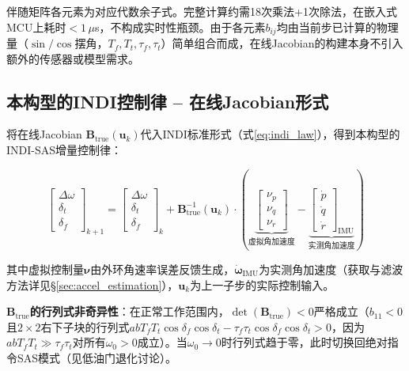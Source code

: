 伴随矩阵各元素为对应代数余子式。完整计算约需18次乘法+1次除法，在嵌入式MCU上耗时$<1\,\mu$s，不构成实时性瓶颈。由于各元素$b_{ij}$均由当前步已计算的物理量（$\sin/\cos$摆角，$T_f,T_t,\tau_f,\tau_t$）简单组合而成，在线Jacobian的构建本身不引入额外的传感器或模型需求。

\subsection{本构型的INDI控制律 -- 在线Jacobian形式}

将在线Jacobian $\mathbf{B}_{\mathrm{true}}(\mathbf{u}_k)$代入INDI标准形式（式\ref{eq:indi_law}），得到本构型的INDI-SAS增量控制律：

\begin{equation}
    \boxed{
    \begin{bmatrix} \Delta\omega \\ \delta_t \\ \delta_f \end{bmatrix}_{k+1}
    =
    \begin{bmatrix} \Delta\omega \\ \delta_t \\ \delta_f \end{bmatrix}_{k}
    +
    \mathbf{B}_{\mathrm{true}}^{-1}(\mathbf{u}_k)
    \cdot
    \left(
    \underbrace{\begin{bmatrix} \nu_p \\ \nu_q \\ \nu_r \end{bmatrix}}_{\text{虚拟角加速度}}
    -
    \underbrace{\begin{bmatrix} \dot{p} \\ \dot{q} \\ \dot{r} \end{bmatrix}_{\text{IMU}}}_{\text{实测角加速度}}
    \right)
    }
    \label{eq:indi_our_config}
\end{equation}

其中虚拟控制量$\boldsymbol{\nu}$由外环角速率误差反馈生成，$\dot{\boldsymbol{\omega}}_{\text{IMU}}$为实测角加速度（获取与滤波方法详见§\ref{sec:accel_estimation}），$\mathbf{u}_k$为上一子步的实际控制输入。

\textbf{$\mathbf{B}_{\mathrm{true}}$的行列式非奇异性}：在正常工作范围内，$\det(\mathbf{B}_{\mathrm{true}})<0$严格成立（$b_{11}<0$且$2\times2$右下子块的行列式$abT_fT_t\cos\delta_f\cos\delta_t-\tau_f\tau_t\cos\delta_f\cos\delta_t>0$，因为$abT_fT_t\gg\tau_f\tau_t$对所有$\omega_0>0$成立）。当$\omega_0\to 0$时行列式趋于零，此时切换回绝对指令SAS模式（见低油门退化讨论）。


